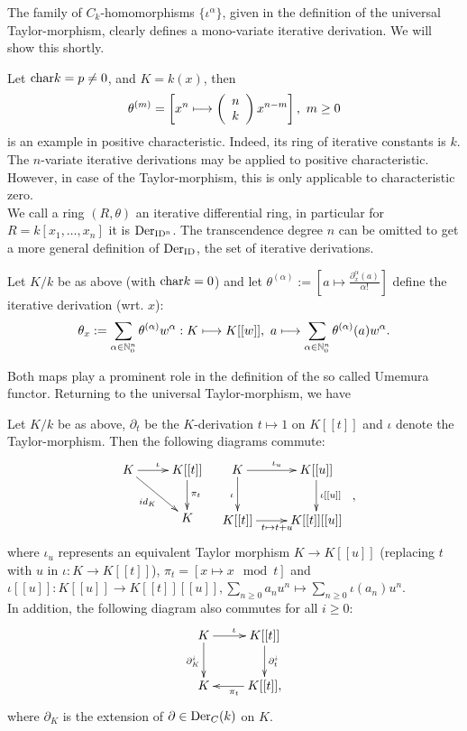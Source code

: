 \bsp
\bn
\item The family of $C_k$-homomorphisms $\{\iota^{\alpha}\}$, given in the definition of the universal Taylor-morphism, clearly defines a mono-variate iterative derivation. We will show this shortly.
\item Let $\trm{char} k = p \neq 0$, and $K = k(x)$, then
$$\theta^{(m)} = \left[x^n \longmapsto \left(\bao{c}
n\\
k\\
\ea\right) x^{n - m}\right],\ m \geq 0$$
is an example in positive characteristic. Indeed, its ring of iterative constants is $k$.
\en
\bmk The $n$-variate iterative derivations may be applied to positive characteristic. However, in case of the Taylor-morphism, this is only applicable to characteristic zero.\\
\indent We call a ring $(R, \theta)$ an iterative differential ring, in particular for $R = k[x_1,\ldots,x_n]$ it is $\trm{Der}_{\trm{ID^n}}$. The transcendence degree $n$ can be omitted to get a more general definition of $\trm{Der}_{\trm{ID}}$, the set of iterative derivations.
\begin{defi}
Let $K/k$ be as above (with $\trm{char} k = 0$) and let $\theta^{(\alpha)} := \left[a \longmapsto \frac{\partial_x^\alpha(a)}{\alpha!}\right]$ define the iterative derivation (wrt. $x$):
$$\theta_x := \sum_{\alpha \in \nz_0^n} \theta^{(\alpha)} w^\alpha : K \longmapsto K[[w]],\ a \longmapsto \sum_{\alpha \in \nz_0^n} \theta^{(\alpha)}(a) w^\alpha.$$
\end{defi}
Both maps play a prominent role in the definition of the so called Umemura functor. Returning to the universal Taylor-morphism, we have
\begin{lemm}
Let $K/k$ be as above, $\partial_t$ be the $K$-derivation $t \longmapsto 1$ on $K[[t]]$ and $\iota$ denote the Taylor-morphism. Then the following diagrams commute:
$$\bao{cc}
\xymatrix{
K \ar[rd]_{id_K}\ar[r]^\iota &K[[t]]\ar[d]^{\pi_t}\\
&K
}&
\xymatrix{
K \ar[r]^{\iota_u}\ar[d]_{\iota} &K[[u]]\ar[d]^{\iota[[u]]}\\
K[[t]] \ar[r]_{t\mapsto t+u}&K[[t]][[u]]\\
}
\ea,$$
where $\iota_u$ represents an equivalent Taylor morphism $K \longrightarrow K[[u]]$ (replacing $t$ with $u$ in $\iota : K \longrightarrow K[[t]]$), $\pi_t = [x \longmapsto x \mod t]$ and $\iota[[u]] : K[[u]] \longrightarrow K[[t]][[u]], \sum_{n \geq 0} a_n u^n \longmapsto \sum_{n \geq 0} \iota(a_n) u^n$.\\
In addition, the following diagram also commutes for all $i \geq 0$:
$$\xymatrix{
K \ar[r]^\iota\ar[d]_{\partial_K^i}&K[[t]]\ar[d]^{\partial_t^i}\\
K&K[[t]]\ar[l]^{\pi_t},\\
}$$
where $\partial_K$ is the extension of $\partial \in \trm{Der}_C(k)$ on $K$.
\end{lemm}
